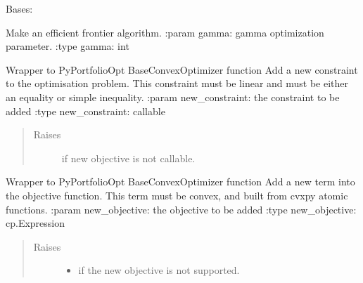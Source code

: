 \documentclass[letterpaper,10pt,english]{sphinxmanual}
\begin{document}

\begin{fulllineitems}
\label{\detokenize{dalio.model:dalio.model.MakeEfficientFrontier}}
Bases: {\hyperref[\detokenize{dalio.model:dalio.model.financial.MakeCriticalLine}]{}}

Make an efficient frontier algorithm.
:param gamma: gamma optimization parameter.
:type gamma: int

\begin{fulllineitems}
\label{\detokenize{dalio.model:dalio.model.MakeEfficientFrontier.add_constraint}}
Wrapper to PyPortfolioOpt BaseConvexOptimizer function
Add a new constraint to the optimisation problem. This constraint must
be linear and must be either an equality or simple inequality.
:param new\_constraint: the constraint to be added
:type new\_constraint: callable
\begin{quote}\begin{description}
\item[{Raises}] \leavevmode
{} \textendash{} if new objective is not callable.

\end{description}\end{quote}

\end{fulllineitems}


\begin{fulllineitems}
\label{\detokenize{dalio.model:dalio.model.MakeEfficientFrontier.add_objective}}
Wrapper to PyPortfolioOpt BaseConvexOptimizer function
Add a new term into the objective function. This term must be convex,
and built from cvxpy atomic functions.
:param new\_objective: the objective to be added
:type new\_objective: cp.Expression
\begin{quote}\begin{description}
\item[{Raises}] \leavevmode\begin{itemize}
\item {} 
 \textendash{} if the new objective is not supported.


\end{itemize}
\end{description}
\end{quote}
\end{fulllineitems}
\end{fulllineitems}
\end{document}

